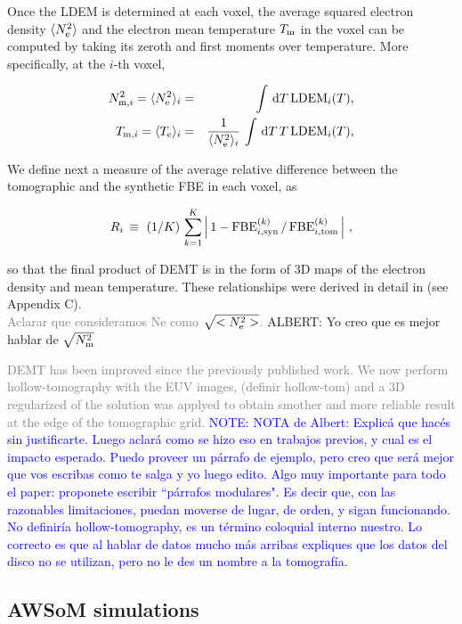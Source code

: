 \documentclass[namedreferences]{solarphysics}
\newcommand{\LDEM}{{\rm LDEM}}
\newcommand{\FBE}{{\rm FBE}}
\newcommand{\Te}{T_{\rm e}}
\newcommand{\Tm}{T_{\rm m}}
\newcommand{\Tmi}{T_{{\rm m},i}}
\newcommand{\Ne}{N_{\rm e}}
\newcommand{\Nsqmi}{N^2_{{\rm m},i}}
\newcommand{\Nsqm}{N^2_{{\rm m}}}
\newcommand{\sqravgN}{\sqrt{\Nsqm}}
\def\temp#1{\textcolor{gray}{#1}}
\def\notebyalbert#1{\textcolor{blue}{NOTE: #1}}
\begin{document}
\begin{article}
Once the LDEM is determined at each voxel, the average squared electron density $\langle \Ne^2 \rangle$ and the electron mean temperature $\Tm$ in the voxel can be computed by taking its zeroth and first moments over temperature. More specifically, at the $i$-th voxel,

{
\begin{eqnarray}\label{momento1}
 \Nsqmi = \langle \Ne^2 \rangle_i &=& \int\,\textrm{d}T\,\LDEM_i(T),\label{Ne} \\ 
\label{momento2}
 \Tmi  = \langle \Te \rangle_i &=& \frac{1}{\langle \Ne^2 \rangle_i}\,\int\,\textrm{d}T\,T\,\LDEM_i(T),\label{Tm} 
\end{eqnarray}
}

{We define next a measure of the average relative difference between the tomographic and the synthetic FBE in each voxel, as}

\begin{equation}\label{R}
R_i \, \equiv \ (1/K) \, \sum_{k=1}^K \left| \, 1 - \FBE^{(k)}_{i,\rm syn}\,/\,\FBE^{(k)}_{i,\rm tom}\, \right| \,,
\end{equation}

so that the final product of DEMT is in the form of 3D maps of the electron density and mean temperature. These relationships {were} derived in detail in \citealt{frazin_2009} (see Appendix C).\\
\temp{Aclarar que consideramos Ne como $\sqrt{<\Ne ^2>}$.} {ALBERT: Yo creo que es mejor hablar de $\sqravgN$}

\temp{DEMT has been improved since the previously published work. We now perform hollow-tomography with the EUV images, (definir hollow-tom) and a 3D regularized of the solution was applyed to obtain smother and more reliable result at the edge of the tomographic grid.} \notebyalbert{NOTA de Albert: Explicá que hacés sin justificarte. Luego aclará como se hizo eso en trabajos previos, y cual es el impacto esperado. Puedo proveer un párrafo de ejemplo, pero creo que será mejor que vos escribas como te salga y yo luego edito. Algo muy importante para todo el paper: proponete escribir ``párrafos modulares". Es decir que, con las razonables limitaciones, puedan moverse de lugar, de orden, y sigan funcionando. No definiría hollow-tomography, es un término coloquial interno nuestro. Lo correcto es que al hablar de datos mucho más arribas expliques que los datos del disco no se utilizan, pero no le des un nombre a la tomografía.}

\subsection{AWSoM simulations}\label{awsom} 


\end{article}
\end{document}
